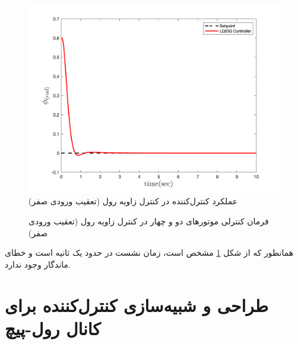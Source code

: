 \documentclass{CCI2020}
\begin{document}
	\begin{figure}[H]
		\includegraphics[width=.48\linewidth]{../Figures/MIL/LQIDG/Roll/lqidg_rollnn_.png}
		\centering
		\caption{عملكرد کنترل‌کننده  در کنترل زاويه رول (تعقیب ورودی صفر)}
		\label{lqidg_roll_fig_simulation}
	\end{figure}
	\begin{figure}[H]
		\centering
		\caption{فرمان کنترلی موتورهای دو و چهار در کنترل زاویه رول (تعقیب ورودی صفر)}
	\end{figure}
	
 همانطور که از شکل
	\ref{lqidg_roll_fig_simulation}
	مشخص است، زمان نشست در حدود یک ثانیه است و خطای ماندگار وجود ندارد.
	\section{طراحی و شبیه‌سازی کنترل‌کننده برای کانال رول-پیچ}
\end{document}
